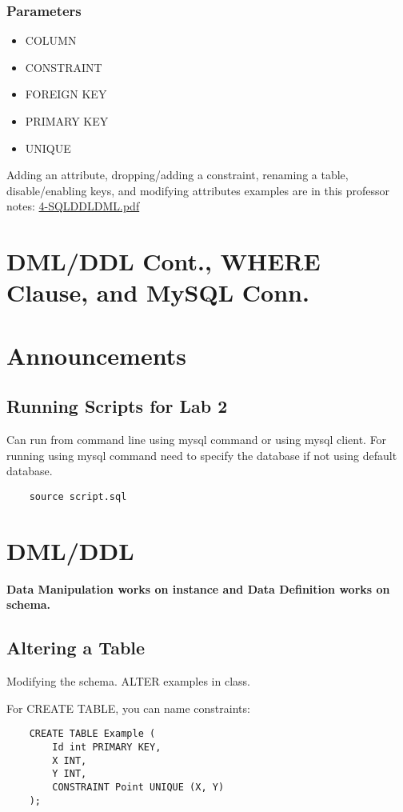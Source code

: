 \documentclass[twoside]{article}
\begin{document}
\subsubsection*{Parameters}
\begin{itemize}
    \item COLUMN
    \item CONSTRAINT
    \item FOREIGN KEY
    \item PRIMARY KEY
    \item UNIQUE
\end{itemize}

Adding an attribute, dropping/adding a constraint, renaming a table, disable/enabling
keys, and modifying attributes examples are in this professor notes: \url{4-SQLDDLDML.pdf}

\newpage
\section{ DML/DDL Cont., WHERE Clause, and MySQL Conn.}

\section*{Announcements}
\subsection*{Running Scripts for Lab 2}
Can run from command line using mysql command or using mysql client. For 
running using
mysql command need to specify the database if not using default database.
\begin{verbatim}
    source script.sql
\end{verbatim}

\section*{DML/DDL}

\textbf{Data Manipulation works on instance and Data Definition works on schema.}

\subsection*{Altering a Table}
Modifying the schema. ALTER examples in class.

For CREATE TABLE, you can name constraints: 
\begin{verbatim}
    CREATE TABLE Example (
        Id int PRIMARY KEY,
        X INT,
        Y INT,
        CONSTRAINT Point UNIQUE (X, Y)
    );
\end{verbatim}
\end{document}
